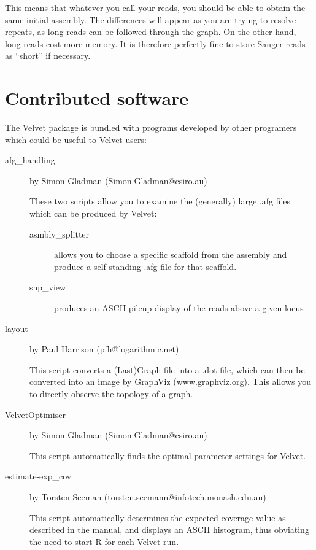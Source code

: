 \documentclass{article}
\begin{document}
This means that whatever you call your reads, you should be able to obtain the same initial assembly. The differences will appear as you are trying to resolve repeats, as long reads can be followed through the graph. On the other hand, long reads cost more memory. It is therefore perfectly fine to store Sanger reads as ``short'' if necessary.

\section{Contributed software}

The Velvet package is bundled with programs developed by other programers which could be useful to Velvet users:

\begin{description}
\item[afg\_handling] by Simon Gladman (Simon.Gladman@csiro.au)

These two scripts allow you to examine the (generally) large .afg files which can be produced by Velvet:

\begin{description}
 
\item[asmbly\_splitter] allows you to choose a specific scaffold from the assembly and produce a self-standing .afg file for that scaffold.

\item[snp\_view] produces an ASCII pileup display of the reads above a given locus 

\end{description}

\item[layout] by Paul Harrison (pfh@logarithmic.net)

This script converts a (Last)Graph file into a .dot file, which can then be converted into an image by GraphViz (www.graphviz.org). This allows you to directly observe the topology of a graph.

\item[VelvetOptimiser] by Simon Gladman (Simon.Gladman@csiro.au)

This script automatically finds the optimal parameter settings for Velvet.

\item[estimate-exp\_cov] by Torsten Seeman (torsten.seemann@infotech.monash.edu.au)

This script automatically determines the expected coverage value as described in the manual, and displays an ASCII histogram, thus obviating the need to start R for each Velvet run.


\end{description}
\end{document}
